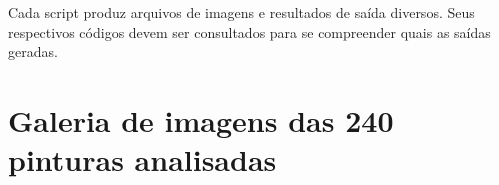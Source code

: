 Cada script produz arquivos de imagens e resultados de saída diversos. Seus
respectivos códigos devem ser consultados para se compreender quais as saídas
geradas.









\afterpage{\blankpage}
\chapter{Galeria de imagens das 240 pinturas analisadas}
\label{cap:ap-galeria}

